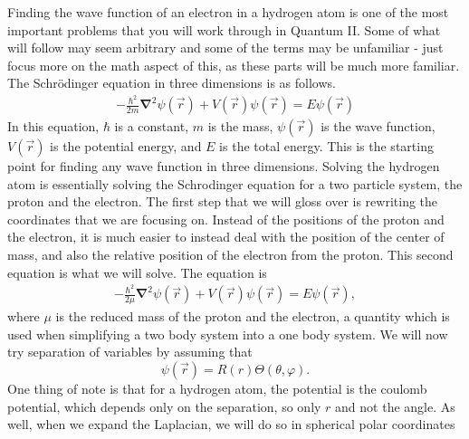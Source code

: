 \documentclass[11pt]{report}
\newcommand{\fpar}[1]{\left({#1}\right)}
\newcommand{\del}{\pmb{\nabla}}
\begin{document}
Finding the wave function of an electron in a hydrogen atom is one of the most important problems that you will work through in Quantum II. Some of what will follow may seem arbitrary and some of the terms may be unfamiliar - just focus more on the math aspect of this, as these parts will be much more familiar. The Schr$\text{\"{o}}$dinger equation in three dimensions is as follows.
    \begin{align*}
        -\frac{\hbar^2}{2m}\del^2\psi\fpar{\vec{r}}+V(\vec{r})\psi\fpar{\vec{r}} = E\psi\fpar{\vec{r}}
    \end{align*}
In this equation, $\hbar$ is a constant, $m$ is the mass, $\psi\fpar{\vec{r}}$ is the wave function, $V\fpar{\vec{r}}$ is the potential energy, and $E$ is the total energy. This is the starting point for finding any wave function in three dimensions. Solving the hydrogen atom is essentially solving the Schrodinger equation for a two particle system, the proton and the electron. The first step that we will gloss over is rewriting the coordinates that we are focusing on. Instead of the positions of the proton and the electron, it is much easier to instead deal with the position of the center of mass, and also the relative position of the electron from the proton. This second equation is what we will solve. The equation is
    \begin{align*}
        -\frac{\hbar^2}{2\mu}\del^2\psi\fpar{\vec{r}}+V(\vec{r})\psi\fpar{\vec{r}} = E\psi\fpar{\vec{r}},
    \end{align*}
where $\mu$ is the reduced mass of the proton and the electron, a quantity which is used when simplifying a two body system into a one body system. We will now try separation of variables by assuming that
    \begin{equation*}
        \psi\fpar{\vec{r}} = R(r)\Theta\fpar{\theta,\varphi}.
    \end{equation*}
One thing of note is that for a hydrogen atom, the potential is the coulomb potential, which depends only on the separation, so only $r$ and not the angle. As well, when we expand the Laplacian, we will do so in spherical polar coordinates
   
\end{document}
